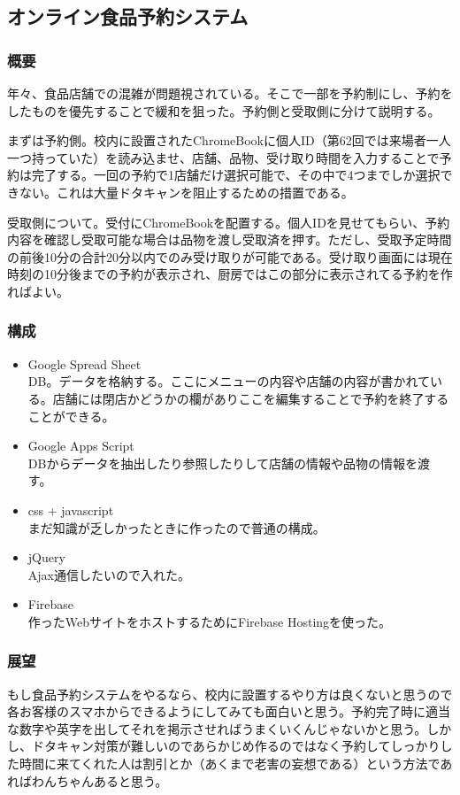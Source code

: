 \documentclass[dvipdfmx,jb5]{jarticle}
\begin{document}
 \subsection{オンライン食品予約システム}\label{sec:オンライン食品予約システム}
 \subsubsection{概要}
 年々、食品店舗での混雑が問題視されている。そこで一部を予約制にし、予約をしたものを優先することで緩和を狙った。予約側と受取側に分けて説明する。

 まずは予約側。校内に設置されたChromeBookに個人ID（第62回では来場者一人一つ持っていた）を読み込ませ、店舗、品物、受け取り時間を入力することで予約は完了する。一回の予約で1店舗だけ選択可能で、その中で4つまでしか選択できない。これは大量ドタキャンを阻止するための措置である。

 受取側について。受付にChromeBookを配置する。個人IDを見せてもらい、予約内容を確認し受取可能な場合は品物を渡し受取済を押す。ただし、受取予定時間の前後10分の合計20分以内でのみ受け取りが可能である。受け取り画面には現在時刻の10分後までの予約が表示され、厨房ではこの部分に表示されてる予約を作ればよい。

 \subsubsection{構成}
 \begin{itemize}
  \item Google Spread Sheet\\
  DB。データを格納する。ここにメニューの内容や店舗の内容が書かれている。店舗には閉店かどうかの欄がありここを編集することで予約を終了することができる。
   \item Google Apps Script\\
   DBからデータを抽出したり参照したりして店舗の情報や品物の情報を渡す。
   \item css + javascript\\
   まだ知識が乏しかったときに作ったので普通の構成。
   \item jQuery\\
   Ajax通信したいので入れた。
   \item Firebase\\
   作ったWebサイトをホストするためにFirebase Hostingを使った。
  \end{itemize}
 \subsubsection{展望}
 もし食品予約システムをやるなら、校内に設置するやり方は良くないと思うので各お客様のスマホからできるようにしてみても面白いと思う。予約完了時に適当な数字や英字を出してそれを掲示させればうまくいくんじゃないかと思う。しかし、ドタキャン対策が難しいのであらかじめ作るのではなく予約してしっかりした時間に来てくれた人は割引とか（あくまで老害の妄想である）という方法であればわんちゃんあると思う。
\end{document}
